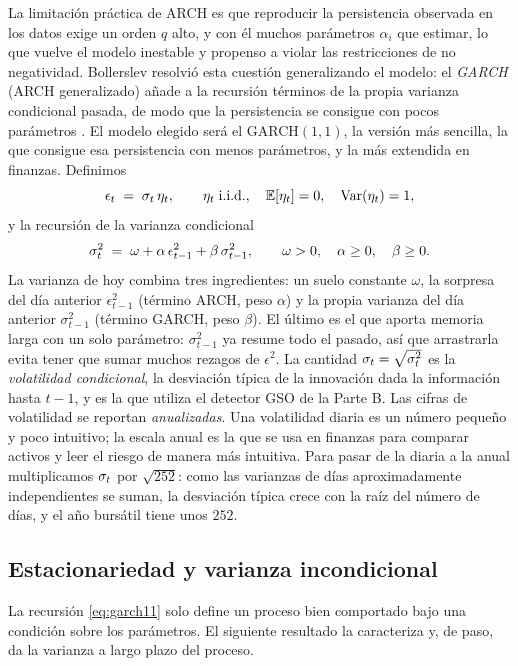 La limitación práctica de ARCH es que reproducir la persistencia observada en los datos exige un orden $q$ alto, y con él muchos parámetros $\alpha_i$ que estimar, lo que vuelve el modelo inestable y propenso a violar las restricciones de no negatividad. Bollerslev resolvió esta cuestión generalizando el modelo: el \emph{GARCH} (ARCH generalizado) añade a la recursión términos de la propia varianza condicional pasada, de modo que la persistencia se consigue con pocos parámetros \cite{bollerslev1986}. El modelo elegido será el GARCH$(1,1)$, la versión más sencilla, la que consigue esa persistencia con menos parámetros, y la más extendida en finanzas. Definimos
\[
\epsilon_t \;=\; \sigma_t\, \eta_t, \qquad \eta_t \;\text{i.i.d.}, \quad \mathbb{E}[\eta_t] = 0, \quad \operatorname{Var}(\eta_t) = 1,
\]
y la recursión de la varianza condicional
\begin{equation}
\label{eq:garch11}
\sigma_t^2 \;=\; \omega + \alpha\, \epsilon_{t-1}^2 + \beta\, \sigma_{t-1}^2,
\qquad \omega > 0, \quad \alpha \ge 0, \quad \beta \ge 0.
\end{equation}
La varianza de hoy combina tres ingredientes: un suelo constante $\omega$, la sorpresa del día anterior $\epsilon_{t-1}^2$ (término ARCH, peso $\alpha$) y la propia varianza del día anterior $\sigma_{t-1}^2$ (término GARCH, peso $\beta$). El último es el que aporta memoria larga con un solo parámetro: $\sigma_{t-1}^2$ ya resume todo el pasado, así que arrastrarla evita tener que sumar muchos rezagos de $\epsilon^2$. La cantidad $\sigma_t = \sqrt{\sigma_t^2}$ es la \emph{volatilidad condicional}, la desviación típica de la innovación dada la información hasta $t-1$, y es la que utiliza el detector GSO de la Parte B. Las cifras de volatilidad se reportan \emph{anualizadas}. Una volatilidad diaria es un número pequeño y poco intuitivo; la escala anual es la que se usa en finanzas para comparar activos y leer el riesgo de manera más intuitiva. Para pasar de la diaria a la anual multiplicamos $\sigma_t$ por $\sqrt{252}$: como las varianzas de días aproximadamente independientes se suman, la desviación típica crece con la raíz del número de días, y el año bursátil tiene unos $252$.

\subsection{Estacionariedad y varianza incondicional}
\label{sec:garch-estac}

La recursión \eqref{eq:garch11} solo define un proceso bien comportado bajo una condición sobre los parámetros. El siguiente resultado la caracteriza y, de paso, da la varianza a largo plazo del proceso.

